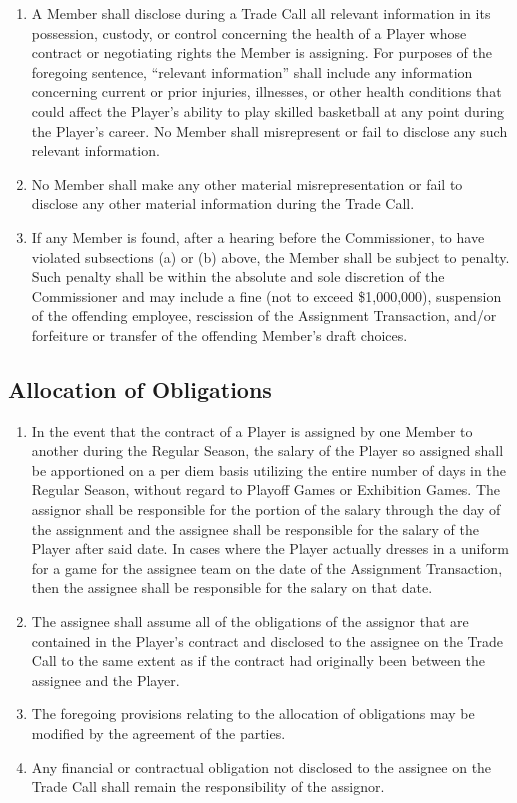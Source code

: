 \documentclass[]{book}
\providecommand{\tightlist}{%
  \setlength{\itemsep}{0pt}\setlength{\parskip}{0pt}}
\theoremstyle{definition}
\theoremstyle{definition}
\theoremstyle{definition}
\theoremstyle{remark}
\begin{document}
\begin{enumerate}
\def\labelenumi{(\alph{enumi})}
\tightlist
\item
  A Member shall disclose during a Trade Call all relevant information
  in its possession, custody, or control concerning the health of a
  Player whose contract or negotiating rights the Member is assigning.
  For purposes of the foregoing sentence, ``relevant information'' shall
  include any information concerning current or prior injuries,
  illnesses, or other health conditions that could affect the Player's
  ability to play skilled basketball at any point during the Player's
  career. No Member shall misrepresent or fail to disclose any such
  relevant information.
\item
  No Member shall make any other material misrepresentation or fail to
  disclose any other material information during the Trade Call.
\item
  If any Member is found, after a hearing before the Commissioner, to
  have violated subsections (a) or (b) above, the Member shall be
  subject to penalty. Such penalty shall be within the absolute and sole
  discretion of the Commissioner and may include a fine (not to exceed
  \$1,000,000), suspension of the offending employee, rescission of the
  Assignment Transaction, and/or forfeiture or transfer of the offending
  Member's draft choices.
\end{enumerate}

\subsection{Allocation of Obligations}\label{allocation-of-obligations}

\begin{enumerate}
\def\labelenumi{(\alph{enumi})}
\tightlist
\item
  In the event that the contract of a Player is assigned by one Member
  to another during the Regular Season, the salary of the Player so
  assigned shall be apportioned on a per diem basis utilizing the entire
  number of days in the Regular Season, without regard to Playoff Games
  or Exhibition Games. The assignor shall be responsible for the portion
  of the salary through the day of the assignment and the assignee shall
  be responsible for the salary of the Player after said date. In cases
  where the Player actually dresses in a uniform for a game for the
  assignee team on the date of the Assignment Transaction, then the
  assignee shall be responsible for the salary on that date.
\item
  The assignee shall assume all of the obligations of the assignor that
  are contained in the Player's contract and disclosed to the assignee
  on the Trade Call to the same extent as if the contract had originally
  been between the assignee and the Player.
\item
  The foregoing provisions relating to the allocation of obligations may
  be modified by the agreement of the parties.
\item
  Any financial or contractual obligation not disclosed to the assignee
  on the Trade Call shall remain the responsibility of the assignor.
\end{enumerate}
\end{document}
